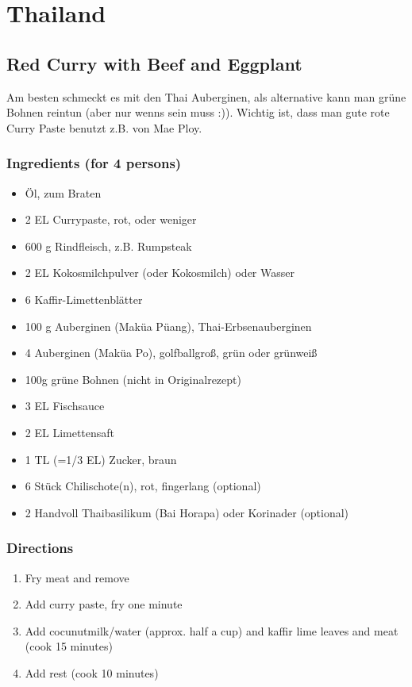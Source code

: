 \section{Thailand}

\subsection{Red Curry with Beef and Eggplant}
Am besten schmeckt es mit den Thai Auberginen, als alternative kann man grüne Bohnen reintun (aber nur wenns sein muss :)). 
Wichtig ist, dass man gute rote Curry Paste benutzt z.B. von Mae Ploy.
\subsubsection*{Ingredients (for 4 persons)}
\begin{itemize}
\item[] Öl, zum Braten
\item[] 2 EL	 Currypaste, rot, oder weniger
\item[] 600 g	 Rindfleisch, z.B. Rumpsteak
\item[] 2 EL Kokosmilchpulver (oder Kokosmilch) oder Wasser
\item[] 6 	 Kaffir-Limettenblätter
\item[] 100 g	 Auberginen (Maküa Püang), Thai-Erbsenauberginen
\item[] 4 	 Auberginen (Maküa Po), golfballgroß, grün oder grünweiß
\item[] 100g  grüne Bohnen (nicht in Originalrezept)
\item[] 3 EL  Fischsauce
\item[] 2  EL	 Limettensaft
\item[] 1 TL (=1/3 EL)	 Zucker, braun
\item[] 6 Stück	 Chilischote(n), rot, fingerlang (optional)
\item[] 2 Handvoll	 Thaibasilikum (Bai Horapa) oder Korinader (optional) 
\end{itemize}
\subsubsection*{Directions}
\begin{enumerate}
\item Fry meat and remove
\item Add curry paste, fry one minute
\item Add cocunutmilk/water (approx. half a cup) and kaffir lime leaves and meat (cook 15 minutes)
\item Add rest (cook 10 minutes)
\end{enumerate}
